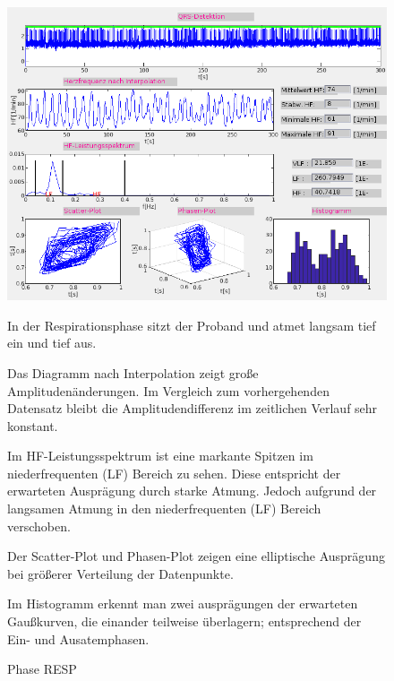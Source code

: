 \documentclass[a4paper,12pt,titlepage]{scrartcl}
\begin{document}
\begin{figure}[ht]
    \begin{minipage}[t]{0.5\linewidth}
        \centering
        \includegraphics[width=0.9\linewidth, valign=t]{Assets/LaborBMT-17-00-21.png}
        \caption{Phase RESP}
        \label{phaseresp}
    \end{minipage}%
    \begin{minipage}[t]{0.5\linewidth}
        In der Respirationsphase sitzt der Proband und atmet langsam tief ein und tief aus.

        Das Diagramm nach Interpolation zeigt große Amplitudenänderungen. Im Vergleich zum vorhergehenden Datensatz bleibt die Amplitudendifferenz im zeitlichen Verlauf sehr konstant.

        Im HF-Leistungsspektrum ist eine markante Spitzen im niederfrequenten (LF) Bereich zu sehen. Diese entspricht der erwarteten Ausprägung durch starke Atmung. Jedoch aufgrund der langsamen Atmung in den niederfrequenten (LF) Bereich verschoben.

        Der Scatter-Plot und Phasen-Plot zeigen eine elliptische Ausprägung bei größerer Verteilung der Datenpunkte.

        Im Histogramm erkennt man zwei ausprägungen der erwarteten Gaußkurven, die einander teilweise überlagern; entsprechend der Ein- und Ausatemphasen.

    \end{minipage}
\end{figure}
\end{document}

